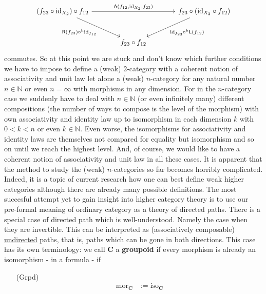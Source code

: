 \[
\begin{tikzcd}[sep=large]
  \left(
    f_{23}
    \circ
    \mathrm{id}_{X_{2}}
  \right)
  \circ
  f_{12}
  \arrow{rr}{\mathsf{A}(f_{12},\mathrm{id}_{X_{2}},f_{23})}
  \arrow[swap]{dr}{\mathsf{R}(f_{23}) \circ^{\textrm{h}} \mathrm{id}_{f_{12}}}
  &
  &
  f_{23}
  \circ
  \left(
    \mathrm{id}_{X_{2}}
    \circ
    f_{12}
  \right)
  \arrow{dl}{\mathrm{id}_{f_{23}} \circ^{\textrm{h}} \mathsf{L}(f_{12})}
  \\
  &
  f_{23}
  \circ
  f_{12}
  &
\end{tikzcd}
\]
commutes. So at this point we are stuck and don't know which further conditions we have to impose to define a (weak) $2$-category with a {\glqq}coherent{\grqq} notion of associativity and unit law let alone a (weak) $n$-category for any natural number $n \in \mathbb{N}$ or even $n = \infty$ with morphisms in any dimension. For in the $n$-category case we suddenly have to deal with $n \in \mathbb{N}$ (or even infinitely many) different compositions (the number of ways to compose is the level of the morphism) with own associativity and identity law up to isomorphism in each dimension $k$ with $0 < k < n$ or even $k \in \mathbb{N}$. Even worse, the isomorphisms for associativity and identity laws are themselves not compared for equality but isomorphism and so on until we reach the highest level. And, of course, we would like to have a {\glqq}coherent{\grqq} notion of associativity and unit law in all these cases. It is apparent that the method to study the (weak) $n$-categories so far becomes horribly complicated. Indeed, it is a topic of current research how one can best define weak higher categories although there are already many possible definitions. The most succesful attempt yet to gain insight into higher category theory is to use our pre-formal meaning of ordinary category as a theory of directed paths. There is a special case of directed path which is well-understood. Namely the case when they are invertible. This can be interpreted as (associatively composable) \underline{undirected} paths, that is, paths which can be gone in both directions. This case has its own terminology: we call $\mathbf{C}$ a \textbf{groupoid} if every morphism is already an isomorphism - in a formula - if
\begin{enumerate}
\item[(Grpd)]
\begin{align*}
  \mathrm{mor}_{\mathbf{C}}
  &:=
  \mathrm{iso}_{\mathbf{C}}
\end{align*}
\end{enumerate}
